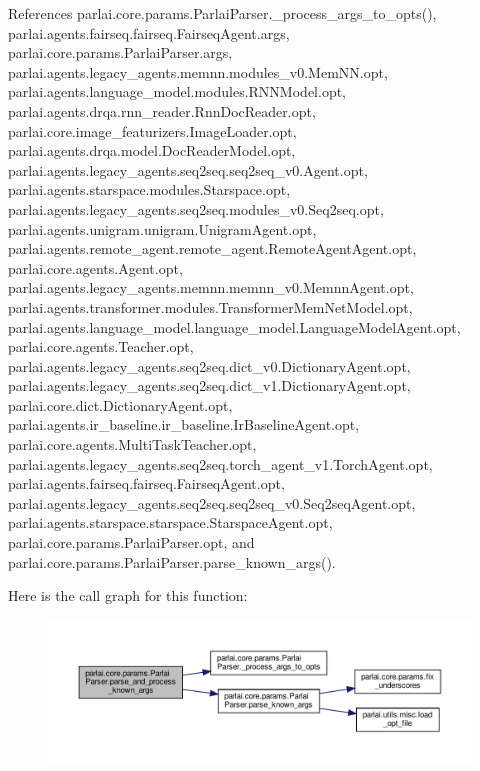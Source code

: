 References parlai.\+core.\+params.\+Parlai\+Parser.\+\_\+process\+\_\+args\+\_\+to\+\_\+opts(), parlai.\+agents.\+fairseq.\+fairseq.\+Fairseq\+Agent.\+args, parlai.\+core.\+params.\+Parlai\+Parser.\+args, parlai.\+agents.\+legacy\+\_\+agents.\+memnn.\+modules\+\_\+v0.\+Mem\+N\+N.\+opt, parlai.\+agents.\+language\+\_\+model.\+modules.\+R\+N\+N\+Model.\+opt, parlai.\+agents.\+drqa.\+rnn\+\_\+reader.\+Rnn\+Doc\+Reader.\+opt, parlai.\+core.\+image\+\_\+featurizers.\+Image\+Loader.\+opt, parlai.\+agents.\+drqa.\+model.\+Doc\+Reader\+Model.\+opt, parlai.\+agents.\+legacy\+\_\+agents.\+seq2seq.\+seq2seq\+\_\+v0.\+Agent.\+opt, parlai.\+agents.\+starspace.\+modules.\+Starspace.\+opt, parlai.\+agents.\+legacy\+\_\+agents.\+seq2seq.\+modules\+\_\+v0.\+Seq2seq.\+opt, parlai.\+agents.\+unigram.\+unigram.\+Unigram\+Agent.\+opt, parlai.\+agents.\+remote\+\_\+agent.\+remote\+\_\+agent.\+Remote\+Agent\+Agent.\+opt, parlai.\+core.\+agents.\+Agent.\+opt, parlai.\+agents.\+legacy\+\_\+agents.\+memnn.\+memnn\+\_\+v0.\+Memnn\+Agent.\+opt, parlai.\+agents.\+transformer.\+modules.\+Transformer\+Mem\+Net\+Model.\+opt, parlai.\+agents.\+language\+\_\+model.\+language\+\_\+model.\+Language\+Model\+Agent.\+opt, parlai.\+core.\+agents.\+Teacher.\+opt, parlai.\+agents.\+legacy\+\_\+agents.\+seq2seq.\+dict\+\_\+v0.\+Dictionary\+Agent.\+opt, parlai.\+agents.\+legacy\+\_\+agents.\+seq2seq.\+dict\+\_\+v1.\+Dictionary\+Agent.\+opt, parlai.\+core.\+dict.\+Dictionary\+Agent.\+opt, parlai.\+agents.\+ir\+\_\+baseline.\+ir\+\_\+baseline.\+Ir\+Baseline\+Agent.\+opt, parlai.\+core.\+agents.\+Multi\+Task\+Teacher.\+opt, parlai.\+agents.\+legacy\+\_\+agents.\+seq2seq.\+torch\+\_\+agent\+\_\+v1.\+Torch\+Agent.\+opt, parlai.\+agents.\+fairseq.\+fairseq.\+Fairseq\+Agent.\+opt, parlai.\+agents.\+legacy\+\_\+agents.\+seq2seq.\+seq2seq\+\_\+v0.\+Seq2seq\+Agent.\+opt, parlai.\+agents.\+starspace.\+starspace.\+Starspace\+Agent.\+opt, parlai.\+core.\+params.\+Parlai\+Parser.\+opt, and parlai.\+core.\+params.\+Parlai\+Parser.\+parse\+\_\+known\+\_\+args().

Here is the call graph for this function\+:
\nopagebreak
\begin{figure}[H]
\begin{center}
\leavevmode
\includegraphics[width=350pt]{classparlai_1_1core_1_1params_1_1ParlaiParser_a0409771a420d08fb51a792a089806c70_cgraph}
\end{center}
\end{figure}
\mbox{\label{classparlai_1_1core_1_1params_1_1ParlaiParser_ad549d75e2808d63fbc5c5d0e30682f18}} 

